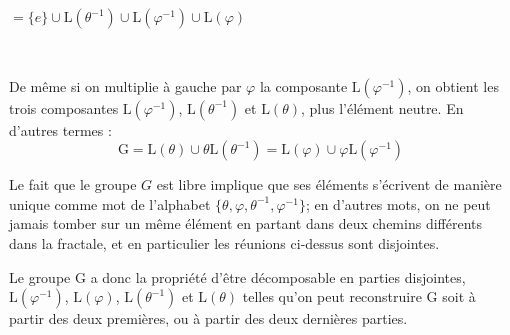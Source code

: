   \begin{minipage}{0.3\textwidth}
  \centering
  $=\{e\}\cup \mathrm{L}(\theta^{-1}) \cup \mathrm{L}(\varphi^{-1}) \cup \mathrm{L}(\varphi)$
  \end{minipage}%
\\
\bigskip

\noindent
  De même si on multiplie à gauche par $\varphi$ la composante $\mathrm{L}(\varphi^{-1})$, on obtient les trois composantes $\mathrm{L}(\varphi^{-1})$, $\mathrm{L}(\theta^{-1})$ et $\mathrm{L}(\theta)$, plus l'élément neutre.
  En d'autres termes :
  $$\mathrm{G} = \mathrm{L}(\theta)\cup\theta\mathrm{L}(\theta^{-1})= \mathrm{L}(\varphi)\cup\varphi\mathrm{L}(\varphi^{-1})$$

  \begin{remarkk}\label{remarque2}
    Le fait que le groupe $G$ est libre implique que ses éléments s'écrivent de manière unique comme mot de l'alphabet $\{\theta, \varphi, \theta^{-1}, \varphi^{-1}\}$; en d'autres mots, on ne peut jamais tomber sur un même élément en partant dans deux chemins différents dans la fractale, et en particulier les réunions ci-dessus sont disjointes.
  \end{remarkk}
  \noindent
  Le groupe $\mathrm{G}$ a donc la propriété d'être décomposable en parties disjointes, $\mathrm{L}(\varphi^{-1})$, $\mathrm{L}(\varphi)$, $\mathrm{L}(\theta^{-1})$ et $\mathrm{L}(\theta)$ telles qu'on peut reconstruire $\mathrm{G}$ soit à partir des deux premières, ou à partir des deux dernières parties.
